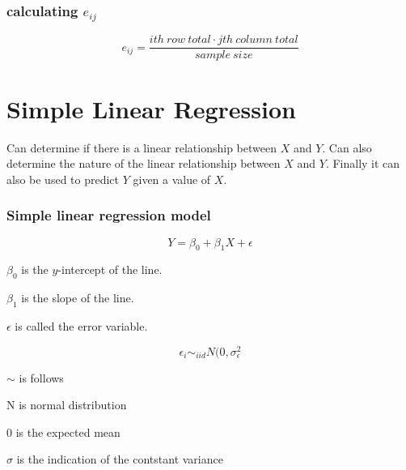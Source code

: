 \documentclass{article}
\begin{document}
\subsubsection{calculating $e_{ij}$}

$$
e_{ij} = \frac{ith\:row\:total \cdot jth\:column\:total}{sample\:size}
$$



\section{Simple Linear Regression}
Can determine if there is a linear relationship between $X$ and $Y$. Can also determine the nature of the linear relationship between $X$ and $Y$. Finally it can also be used to predict $Y$ given a value of $X$.

\subsubsection{Simple linear regression model}

$$
Y = \beta_0 + \beta_1 X + \epsilon
$$

$\beta_0$ is the $y$-intercept of the line.

$\beta_1$ is the slope of the line.

$\epsilon$ is called the error variable.



$$
\epsilon_i \sim_{iid} N(0, \sigma^2_\epsilon
$$

$\sim$ is follows

N is normal distribution

0 is the expected mean

$\sigma$ is the indication of the contstant variance
\end{document}
